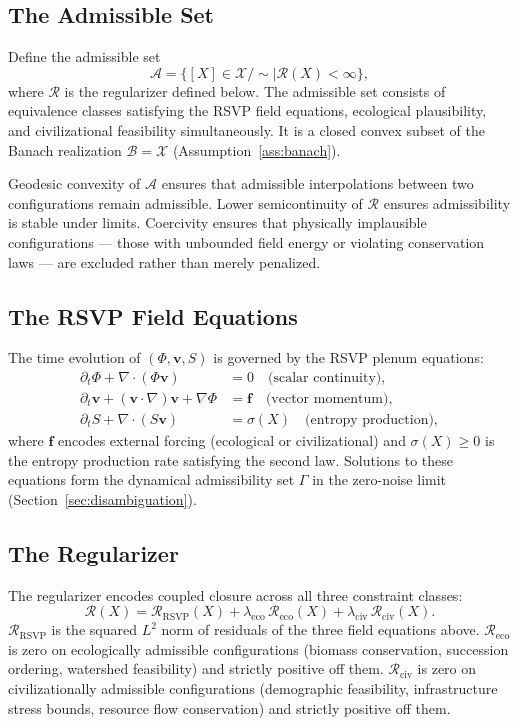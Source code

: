 \documentclass[12pt, oneside]{article}
\begin{document}
\subsection{The Admissible Set}

Define the admissible set
\[
\mathcal{A} = \{ [X] \in \mathcal{X}/{\sim} \mid \mathcal{R}(X) < \infty \},
\]
where $\mathcal{R}$ is the regularizer defined below. The admissible set consists of
equivalence classes satisfying the RSVP field equations, ecological plausibility, and
civilizational feasibility simultaneously. It is a closed convex subset of the Banach
realization $\mathcal{B} = \mathcal{X}$ (Assumption~\ref{ass:banach}).

Geodesic convexity of $\mathcal{A}$ ensures that admissible interpolations between two
configurations remain admissible. Lower semicontinuity of $\mathcal{R}$ ensures
admissibility is stable under limits. Coercivity ensures that physically implausible
configurations --- those with unbounded field energy or violating conservation laws ---
are excluded rather than merely penalized.

\subsection{The RSVP Field Equations}

The time evolution of $(\Phi, \mathbf{v}, S)$ is governed by the RSVP plenum equations:
\begin{align*}
\partial_t \Phi + \nabla \cdot (\Phi \mathbf{v}) &= 0
\quad \text{(scalar continuity)}, \\
\partial_t \mathbf{v} + (\mathbf{v} \cdot \nabla)\mathbf{v} + \nabla\Phi &= \mathbf{f}
\quad \text{(vector momentum)}, \\
\partial_t S + \nabla \cdot (S\mathbf{v}) &= \sigma(X)
\quad \text{(entropy production)},
\end{align*}
where $\mathbf{f}$ encodes external forcing (ecological or civilizational) and
$\sigma(X) \ge 0$ is the entropy production rate satisfying the second law. Solutions
to these equations form the dynamical admissibility set $\Gamma$ in the zero-noise limit
(Section~\ref{sec:disambiguation}).

\subsection{The Regularizer}

The regularizer encodes coupled closure across all three constraint classes:
\[
\mathcal{R}(X) = \mathcal{R}_{\mathrm{RSVP}}(X)
+ \lambda_{\mathrm{eco}}\,\mathcal{R}_{\mathrm{eco}}(X)
+ \lambda_{\mathrm{civ}}\,\mathcal{R}_{\mathrm{civ}}(X).
\]
$\mathcal{R}_{\mathrm{RSVP}}$ is the squared $L^2$ norm of residuals of the three
field equations above. $\mathcal{R}_{\mathrm{eco}}$ is zero on ecologically admissible
configurations (biomass conservation, succession ordering, watershed feasibility) and
strictly positive off them. $\mathcal{R}_{\mathrm{civ}}$ is zero on civilizationally
admissible configurations (demographic feasibility, infrastructure stress bounds,
resource flow conservation) and strictly positive off them.
\end{document}
